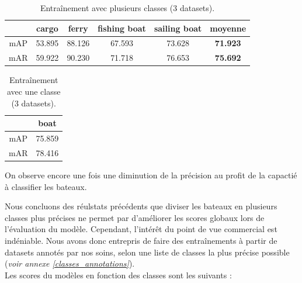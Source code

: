 \begin{table}[H]
    \begin{center}
        \begin{tabular}{c c c c c c}
            \hline
            & cargo & ferry & fishing boat & sailing boat & \textbf{moyenne} \\
            \hline
            mAP & 53.895 & 88.126 & 67.593 & 73.628 & \textbf{71.923}\\
            mAR & 59.922 & 90.230 & 71.718 & 76.653 & \textbf{75.692}\\
        \end{tabular}
    \end{center}
    \caption{Entraînement avec plusieurs classes (3 datasets).}
\end{table}

\begin{table}[H]
    \begin{center}
        \begin{tabular}{c c}
            \hline
            & boat  \\
            \hline
            mAP & 75.859 \\
            mAR & 78.416 \\
        \end{tabular}
    \end{center}
    \caption{Entraînement avec une classe (3 datasets).}
\end{table}

On observe encore une fois une diminution de la précision au profit de la capactié à classifier
les bateaux. 

Nous concluons des réulstats précédents que diviser les bateaux en plusieurs classes plus précises
ne permet par d'améliorer les scores globaux lors de l'évaluation du modèle. Cependant, 
l'intérêt du point de vue commercial est indéniable. Nous avons donc entrepris de faire des 
entraînements à partir de datasets annotés par nos soins, selon une liste de classes 
la plus précise possible (\textit{voir annexe \ref{classes_annotations}}).\\

Les scores du modèles en fonction des classes sont les suivants : \\

